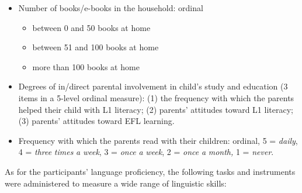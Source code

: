 \documentclass[output=paper,modfonts,nonflat,newtxmath]{langsci/langscibook}
\begin{document}
\begin{itemize}
\item
Number of books/e-books in the household: ordinal


\begin{itemize}
\item
between 0 and 50 books at home

\item
between 51 and 100 books at home

\item
more than 100 books at home

\end{itemize}
\item
Degrees of in/direct parental involvement in child’s study and education (3 items in a 5-level ordinal measure):
(1) the frequency with which the parents helped their child with L1 literacy;
(2) parents’ attitudes toward L1 literacy;
(3) parents’ attitudes toward EFL learning.

\item
Frequency with which the parents read with their children: ordinal, 5 = \textit{daily}, 4 = \textit{three} \textit{times} \textit{a} \textit{week}, 3 = \textit{once} \textit{a} \textit{week}, 2 = \textit{once} \textit{a} \textit{month,} 1 = \textit{never}.

\end{itemize}

As for the participants’ language proficiency, the following tasks and instruments were administered to measure a wide range of linguistic skills:
\end{document}
